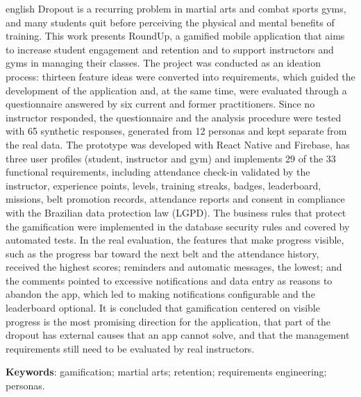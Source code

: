 \begin{resumo}[Abstract]
\begin{otherlanguage*}{english}
\SingleSpacing
\noindent Dropout is a recurring problem in martial arts and combat sports
gyms, and many students quit before perceiving the physical and mental
benefits of training. This work presents RoundUp, a gamified mobile
application that aims to increase student engagement and retention and to
support instructors and gyms in managing their classes. The project was
conducted as an ideation process: thirteen feature ideas were converted
into requirements, which guided the development of the application and,
at the same time, were evaluated through a questionnaire answered by six
current and former practitioners. Since no instructor responded, the
questionnaire and the analysis procedure were tested with 65 synthetic
responses, generated from 12 personas and kept separate from the real
data. The prototype was developed with React Native and Firebase, has
three user profiles (student, instructor and gym) and implements 29 of the 33 functional requirements, including attendance check-in validated by
the instructor, experience points, levels, training streaks, badges,
leaderboard, missions, belt promotion records, attendance reports and
consent in compliance with the Brazilian data protection law (LGPD). The
business rules that protect the gamification were implemented in the
database security rules and covered by automated tests. In the real
evaluation, the features that make progress visible, such as the progress
bar toward the next belt and the attendance history, received the highest
scores; reminders and automatic messages, the lowest; and the comments
pointed to excessive notifications and data entry as reasons to abandon
the app, which led to making notifications configurable and the
leaderboard optional. It is concluded that gamification centered on
visible progress is the most promising direction for the application,
that part of the dropout has external causes that an app cannot solve,
and that the management requirements still need to be evaluated by real
instructors.

\vspace{\onelineskip}
\noindent\textbf{Keywords}: gamification; martial arts; retention; requirements engineering; personas.
\end{otherlanguage*}
\end{resumo}
